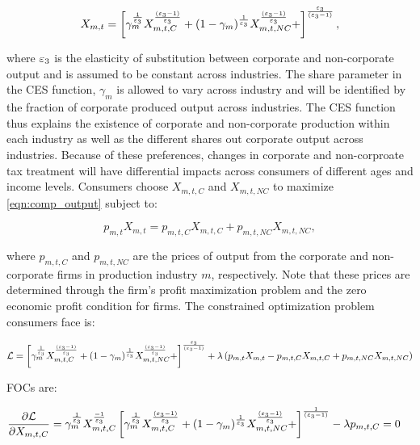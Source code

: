                   \begin{equation} \label{eqn:comp_output}
             X_{m,t} = \left[\gamma_{m}^{\frac{1}{\varepsilon_{3}}}X_{m,t,C}^{\frac{(\varepsilon_{3}-1)}{\varepsilon_{3}}}+(1-\gamma_{m})^{\frac{1}{\varepsilon_{3}}}X_{m,t,NC}^{\frac{(\varepsilon_{3}-1)}{\varepsilon_{3}}}+\right]^{\frac{\varepsilon_{3}}{(\varepsilon_{3}-1)}}, 
    	\end{equation}
	
	\noindent where $\varepsilon_{3}$ is the elasticity of substitution between corporate and non-corporate output and is assumed to be constant across industries.  The share parameter in the CES function, $\gamma_{m}$ is allowed to vary across industry and will be identified by the fraction of corporate produced output across industries.  The CES function thus explains the existence of corporate and non-corporate production within each industry as well as the different shares out corporate output across industries.  Because of these preferences, changes in corporate and non-corproate tax treatment will have differential impacts across consumers of different ages and income levels.  
	Consumers choose $X_{m,t,C}$ and $X_{m,t,NC}$ to maximize \ref{eqn:comp_output} subject to:
	
	 \begin{equation} \label{eqn:comp_output_cons}
             p_{m,t}X_{m,t} = p_{m,t,C}X_{m,t,C}+p_{m,t,NC}X_{m,t,NC}, 
    	\end{equation}
	
	
\noindent where $p_{m,t,C}$ and $p_{m,t,NC}$ are the prices of output from the corporate and non-corporate firms in production industry $m$, respectively.  Note that these prices are determined through the firm's profit maximization problem and the zero economic profit condition for firms. The constrained optimization problem consumers face is: 
    
 \begin{equation} \label{eqn:comp_output_lagrangian}
	\begin{split}
	 \mathcal{L} = \left[\gamma_{m}^{\frac{1}{\varepsilon_{3}}}X_{m,t,C}^{\frac{(\varepsilon_{3}-1)}{\varepsilon_{3}}}+(1-\gamma_{m})^{\frac{1}{\varepsilon_{3}}}X_{m,t,NC}^{\frac{(\varepsilon_{3}-1)}{\varepsilon_{3}}}+\right]^{\frac{\varepsilon_{3}}{(\varepsilon_{3}-1)}} + \lambda\left(p_{m,t}X_{m,t} - p_{m,t,C}X_{m,t,C}+p_{m,t,NC}X_{m,t,NC}\right)
  	\end{split}
\end{equation}
    
    FOCs are:
    
\begin{equation} \label{eqn:comp_output_foc_C}
	\begin{split}
       	&  \frac{\partial \mathcal{L}}{\partial X_{m,t,C}} = \gamma_{m}^{\frac{1}{\varepsilon_{3}}} X_{m,t,C}^{\frac{-1}{\varepsilon_{3}}} \left[\gamma_{m}^{\frac{1}{\varepsilon_{3}}}X_{m,t,C}^{\frac{(\varepsilon_{3}-1)}{\varepsilon_{3}}}+(1-\gamma_{m})^{\frac{1}{\varepsilon_{3}}}X_{m,t,NC}^{\frac{(\varepsilon_{3}-1)}{\varepsilon_{3}}}+\right]^{\frac{1}{(\varepsilon_{3}-1)}} - \lambda p_{m,t,C} = 0
      	 \end{split}
\end{equation}
    
